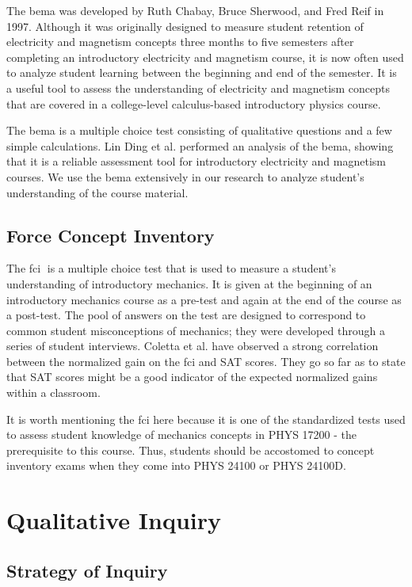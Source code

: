 The \gls{bema} was developed by Ruth Chabay, Bruce Sherwood, and Fred Reif in 1997. Although it was originally designed to measure student retention of electricity and magnetism concepts three months to five semesters after completing an introductory electricity and magnetism course, it is now often used to analyze student learning between the beginning and end of the semester. It is a useful tool to assess the understanding of electricity and magnetism concepts that are covered in a college-level calculus-based introductory physics course\cite{ding2006}.

The \gls{bema} is a multiple choice test consisting of qualitative questions and a few simple calculations. Lin Ding et al. performed an analysis of the \gls{bema}, showing that it is a reliable assessment tool for introductory electricity and magnetism courses\cite{ding2006}. We use the \gls{bema} extensively in our research to analyze student's understanding of the course material.

\subsection{Force Concept Inventory}

The \gls{fci}􏰁 is a multiple choice test that is used to measure a student's understanding of introductory mechanics. It is given at the beginning of an introductory mechanics course as a pre-test and again at the end of the course as a post-test. The pool of answers on the test are designed to correspond to common student misconceptions of mechanics; they were developed through a series of student interviews\cite{hestenes1992}. Coletta et al. have observed a strong correlation between the normalized gain on the \gls{fci} and SAT scores. They go so far as to state that SAT scores might be a good indicator of the expected normalized gains within a classroom\cite{coletta2007}.

It is worth mentioning the \gls{fci} here because it is one of the standardized tests used to assess student knowledge of mechanics concepts in PHYS 17200 - the prerequisite to this course. Thus, students should be accostomed to concept inventory exams when they come into PHYS 24100 or PHYS 24100D.

\section{Qualitative Inquiry}

\subsection{Strategy of Inquiry}


